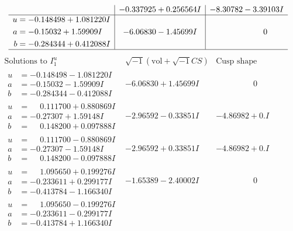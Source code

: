 \documentclass[1p]{elsarticle_modified}
\theoremstyle{definition}
\newcommand{\I}{\sqrt{-1}}
\begin{document}
$$\begin{array}{c|c|c}
 & -0.337925 + 0.256564 I & -8.30782 - 3.39103 I \\ \hline\begin{aligned}
u &= -0.148498 + 1.081220 I \\
a &= -0.15032 + 1.59909 I \\
b &= -0.284344 + 0.412088 I\end{aligned}
 & -6.06830 - 1.45699 I & \phantom{-0.000000 } 0\\
 \hline 
 \end{array}$$\newpage$$\begin{array}{c|c|c}  
\text{Solutions to }I^u_{1}& \I (\text{vol} + \sqrt{-1}CS) & \text{Cusp shape}\\
 \hline 
\begin{aligned}
u &= -0.148498 - 1.081220 I \\
a &= -0.15032 - 1.59909 I \\
b &= -0.284344 - 0.412088 I\end{aligned}
 & -6.06830 + 1.45699 I & \phantom{-0.000000 } 0 \\ \hline\begin{aligned}
u &= \phantom{-}0.111700 + 0.880869 I \\
a &= -0.27307 + 1.59148 I \\
b &= \phantom{-}0.148200 + 0.097888 I\end{aligned}
 & -2.96592 - 0.33851 I & -4.86982 + 0. I\phantom{ +0.000000I} \\ \hline\begin{aligned}
u &= \phantom{-}0.111700 - 0.880869 I \\
a &= -0.27307 - 1.59148 I \\
b &= \phantom{-}0.148200 - 0.097888 I\end{aligned}
 & -2.96592 + 0.33851 I & -4.86982 + 0. I\phantom{ +0.000000I} \\ \hline\begin{aligned}
u &= \phantom{-}1.095650 + 0.199276 I \\
a &= -0.233611 + 0.299177 I \\
b &= -0.413784 - 1.166340 I\end{aligned}
 & -1.65389 - 2.40002 I & \phantom{-0.000000 } 0 \\ \hline\begin{aligned}
u &= \phantom{-}1.095650 - 0.199276 I \\
a &= -0.233611 - 0.299177 I \\
b &= -0.413784 + 1.166340 I\end{aligned}

\end{array}$$
\end{document}
